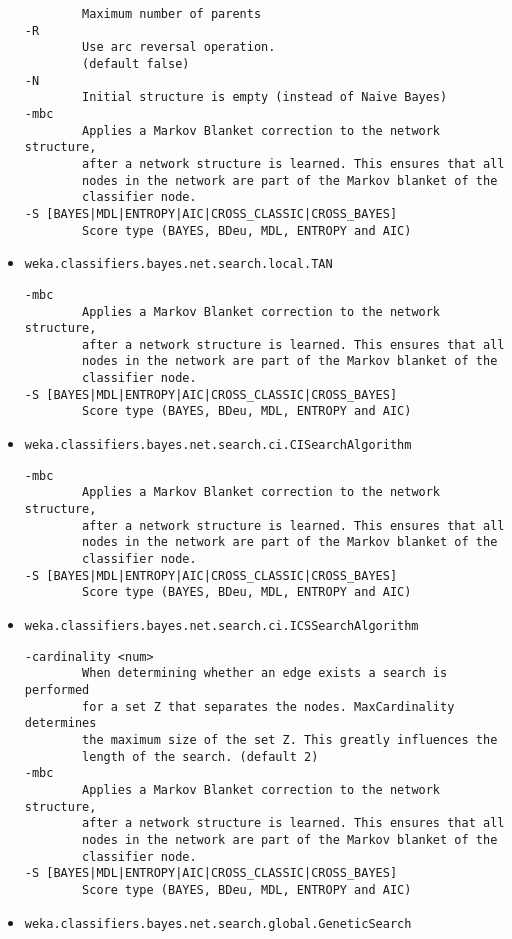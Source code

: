 \begin{itemize}
\begin{verbatim}
        Maximum number of parents
-R
        Use arc reversal operation.
        (default false)
-N
        Initial structure is empty (instead of Naive Bayes)
-mbc
        Applies a Markov Blanket correction to the network structure,
        after a network structure is learned. This ensures that all
        nodes in the network are part of the Markov blanket of the
        classifier node.
-S [BAYES|MDL|ENTROPY|AIC|CROSS_CLASSIC|CROSS_BAYES]
        Score type (BAYES, BDeu, MDL, ENTROPY and AIC)
  \end{verbatim}
\item \texttt{weka.classifiers.bayes.net.search.local.TAN}
  \begin{verbatim}
-mbc
        Applies a Markov Blanket correction to the network structure,
        after a network structure is learned. This ensures that all
        nodes in the network are part of the Markov blanket of the
        classifier node.
-S [BAYES|MDL|ENTROPY|AIC|CROSS_CLASSIC|CROSS_BAYES]
        Score type (BAYES, BDeu, MDL, ENTROPY and AIC)
  \end{verbatim}
\item \texttt{weka.classifiers.bayes.net.search.ci.CISearchAlgorithm}
  \begin{verbatim}
-mbc
        Applies a Markov Blanket correction to the network structure,
        after a network structure is learned. This ensures that all
        nodes in the network are part of the Markov blanket of the
        classifier node.
-S [BAYES|MDL|ENTROPY|AIC|CROSS_CLASSIC|CROSS_BAYES]
        Score type (BAYES, BDeu, MDL, ENTROPY and AIC)
  \end{verbatim}
\item \texttt{weka.classifiers.bayes.net.search.ci.ICSSearchAlgorithm}
  \begin{verbatim}
-cardinality <num>
        When determining whether an edge exists a search is performed
        for a set Z that separates the nodes. MaxCardinality determines
        the maximum size of the set Z. This greatly influences the
        length of the search. (default 2)
-mbc
        Applies a Markov Blanket correction to the network structure,
        after a network structure is learned. This ensures that all
        nodes in the network are part of the Markov blanket of the
        classifier node.
-S [BAYES|MDL|ENTROPY|AIC|CROSS_CLASSIC|CROSS_BAYES]
        Score type (BAYES, BDeu, MDL, ENTROPY and AIC)
  \end{verbatim}
\item \texttt{weka.classifiers.bayes.net.search.global.GeneticSearch}

\end{itemize}
